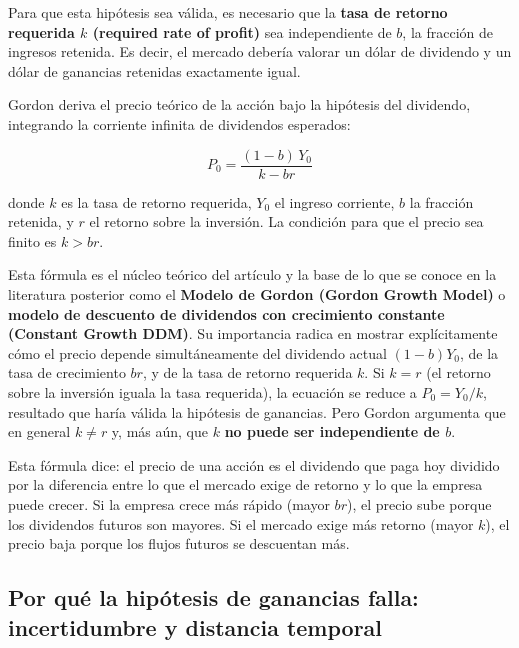 \documentclass[12pt]{article}
\begin{document}
Para que esta hip\'otesis sea v\'alida, es necesario que la \textbf{tasa de retorno requerida $k$ (required rate of profit)} sea independiente de $b$, la fracci\'on de ingresos retenida. Es decir, el mercado deber\'ia valorar un d\'olar de dividendo y un d\'olar de ganancias retenidas exactamente igual.

Gordon deriva el precio te\'orico de la acci\'on bajo la hip\'otesis del dividendo, integrando la corriente infinita de dividendos esperados:

\begin{equation}
P_0 = \frac{(1-b)\,Y_0}{k - br}
\end{equation}

donde $k$ es la tasa de retorno requerida, $Y_0$ el ingreso corriente, $b$ la fracci\'on retenida, y $r$ el retorno sobre la inversi\'on. La condici\'on para que el precio sea finito es $k > br$.

\begin{explicacion}
Esta f\'ormula es el n\'ucleo te\'orico del art\'iculo y la base de lo que se conoce en la literatura posterior como el \textbf{Modelo de Gordon (Gordon Growth Model)} o \textbf{modelo de descuento de dividendos con crecimiento constante (Constant Growth DDM)}. Su importancia radica en mostrar expl\'icitamente c\'omo el precio depende simult\'aneamente del dividendo actual $(1-b)Y_0$, de la tasa de crecimiento $br$, y de la tasa de retorno requerida $k$. Si $k = r$ (el retorno sobre la inversi\'on iguala la tasa requerida), la ecuaci\'on se reduce a $P_0 = Y_0/k$, resultado que har\'ia v\'alida la hip\'otesis de ganancias. Pero Gordon argumenta que en general $k \neq r$ y, m\'as a\'un, que $k$ \textbf{no puede ser independiente de $b$}.
\end{explicacion}

\begin{intuicion}
Esta f\'ormula dice: el precio de una acci\'on es el dividendo que paga hoy dividido por la diferencia entre lo que el mercado exige de retorno y lo que la empresa puede crecer. Si la empresa crece m\'as r\'apido (mayor $br$), el precio sube porque los dividendos futuros son mayores. Si el mercado exige m\'as retorno (mayor $k$), el precio baja porque los flujos futuros se descuentan m\'as.
\end{intuicion}

\subsection{Por qu\'e la hip\'otesis de ganancias falla: incertidumbre y distancia temporal}
\end{document}
